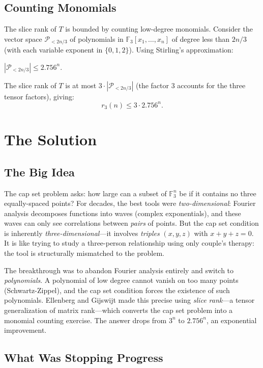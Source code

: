 \subsection{Counting Monomials}

The slice rank of $T$ is bounded by counting low-degree monomials. Consider the vector space $\mathcal{P}_{<2n/3}$ of polynomials in $\mathbb{F}_3[x_1, \ldots, x_n]$ of degree less than $2n/3$ (with each variable exponent in $\{0, 1, 2\}$). Using Stirling's approximation:

\begin{theorem}
$|\mathcal{P}_{<2n/3}| \le 2.756^n$.
\end{theorem}

The slice rank of $T$ is at most $3 \cdot |\mathcal{P}_{<2n/3}|$ (the factor 3 accounts for the three tensor factors), giving:
\[
r_3(n) \le 3 \cdot 2.756^n.
\]

\section{The Solution}

\subsection{The Big Idea}

The cap set problem asks: how large can a subset of $\mathbb{F}_3^n$ be if it contains no three equally-spaced points? For decades, the best tools were \emph{two-dimensional}: Fourier analysis decomposes functions into waves (complex exponentials), and these waves can only see correlations between \emph{pairs} of points. But the cap set condition is inherently \emph{three-dimensional}---it involves \emph{triples} $(x, y, z)$ with $x + y + z = 0$. It is like trying to study a three-person relationship using only couple's therapy: the tool is structurally mismatched to the problem.

The breakthrough was to abandon Fourier analysis entirely and switch to \emph{polynomials}. A polynomial of low degree cannot vanish on too many points (Schwartz-Zippel), and the cap set condition forces the existence of such polynomials. Ellenberg and Gijswijt made this precise using \emph{slice rank}---a tensor generalization of matrix rank---which converts the cap set problem into a monomial counting exercise. The answer drops from $3^n$ to $2.756^n$, an exponential improvement.

\subsection{What Was Stopping Progress}

